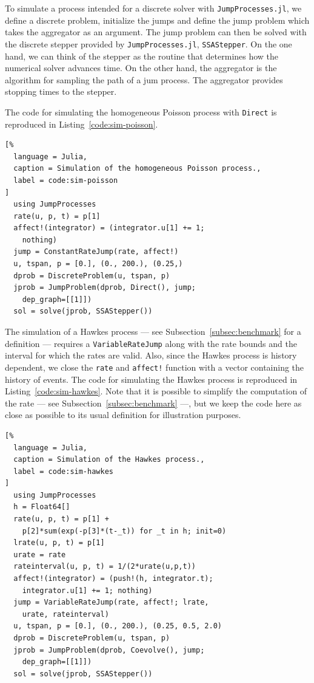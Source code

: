 \documentclass{juliacon}
\numberwithin{equation}{section}
\begin{document}
To simulate a process intended for a discrete solver with \texttt{JumpProcesses.jl}, we define a discrete problem, initialize the jumps and define the jump problem which takes the aggregator as an argument. The jump problem can then be solved with the discrete stepper provided by \texttt{JumpProcesses.jl}, \texttt{SSAStepper}. On the one hand, we can think of the stepper as the routine that determines how the numerical solver advances time. On the other hand, the aggregator is the algorithm for sampling the path of a jum process. The aggregator provides stopping times to the stepper.

The code for simulating the homogeneous Poisson process with \texttt{Direct} is reproduced in Listing~\ref{code:sim-poisson}.

\begin{lstlisting}[%
  language = Julia,
  caption = Simulation of the homogeneous Poisson process.,
  label = code:sim-poisson
]
  using JumpProcesses
  rate(u, p, t) = p[1]
  affect!(integrator) = (integrator.u[1] += 1;
    nothing)
  jump = ConstantRateJump(rate, affect!)
  u, tspan, p = [0.], (0., 200.), (0.25,)
  dprob = DiscreteProblem(u, tspan, p)
  jprob = JumpProblem(dprob, Direct(), jump;
    dep_graph=[[1]])
  sol = solve(jprob, SSAStepper())
\end{lstlisting}

The simulation of a Hawkes process --- see Subsection~\ref{subsec:benchmark} for a definition --- requires a \texttt{VariableRateJump} along with the rate bounds and the interval for which the rates are valid. Also, since the Hawkes process is history dependent, we close the \texttt{rate} and \texttt{affect!} function with a vector containing the history of events. The code for simulating the Hawkes process is reproduced in Listing~\ref{code:sim-hawkes}. Note that it is possible to simplify the computation of the rate --- see Subsection~\ref{subsec:benchmark} ---, but we keep the code here as close as possible to its usual definition for illustration purposes.

\begin{lstlisting}[%
  language = Julia,
  caption = Simulation of the Hawkes process.,
  label = code:sim-hawkes
]
  using JumpProcesses
  h = Float64[]
  rate(u, p, t) = p[1] +
    p[2]*sum(exp(-p[3]*(t-_t)) for _t in h; init=0)
  lrate(u, p, t) = p[1]
  urate = rate
  rateinterval(u, p, t) = 1/(2*urate(u,p,t))
  affect!(integrator) = (push!(h, integrator.t);
    integrator.u[1] += 1; nothing)
  jump = VariableRateJump(rate, affect!; lrate,
    urate, rateinterval)
  u, tspan, p = [0.], (0., 200.), (0.25, 0.5, 2.0)
  dprob = DiscreteProblem(u, tspan, p)
  jprob = JumpProblem(dprob, Coevolve(), jump;
    dep_graph=[[1]])
  sol = solve(jprob, SSAStepper())
\end{lstlisting}
\end{document}
